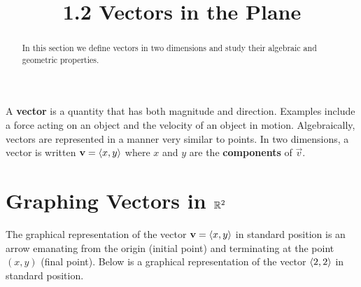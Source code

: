 \documentclass[handout]{ximera}
\title{1.2 Vectors in the Plane}
\begin{document}
\begin{abstract}
In this section we define vectors in two dimensions and study their algebraic and geometric properties.
\end{abstract}
 
\maketitle

A {\bf vector} is a quantity that has both magnitude and direction. Examples include a force acting on an object and the velocity of an object in motion.
Algebraically, vectors are represented in a manner very similar to points.  In two dimensions, a vector is written $\mathbf{v} = \left\langle x,y\right\rangle$  
where $x$ and $y$ are the {\bf components} of $\vec{v}$.


\section{Graphing Vectors in $\mathbb R^2$}
The graphical representation of the vector $\mathbf{v} = \left\langle x,y\right\rangle$ in standard position
is an arrow emanating from the origin (initial point) and terminating at the point $(x,y)$ (final point).
Below is a graphical representation of the vector $\left\langle 2,2\right\rangle$ in standard position.

\begin{image}
\end{image}
\end{document}
